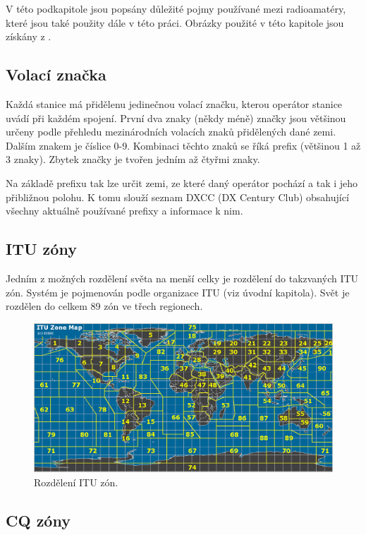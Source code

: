 V této podkapitole jsou popsány důležité pojmy používané mezi radioamatéry, které jsou také použity dále v této práci.
Obrázky použité v této kapitole jsou získány z \cite{mapability}.

\subsection{Volací značka}

Každá stanice má přidělenu jedinečnou volací značku, kterou operátor stanice uvádí při každém spojení.
První dva znaky (někdy méně) značky jsou většinou určeny podle přehledu mezinárodních volacích znaků
přidělených dané zemi.
Dalším znakem je číslice 0-9. Kombinaci těchto znaků se říká prefix (většinou 1 až
3 znaky). Zbytek značky je tvořen jedním až čtyřmi znaky.

Na základě prefixu tak lze určit zemi, ze které daný operátor pochází a tak i
jeho přibližnou polohu. K tomu slouží seznam DXCC (DX Century Club)%
obsahující všechny aktuálně používané prefixy a informace k nim.

\subsection{ITU zóny}

Jedním z možných rozdělení světa na menší celky je rozdělení do takzvaných ITU zón.
Systém je pojmenován podle organizace ITU (viz úvodní kapitola). Svět je rozdělen do celkem 
89 zón ve třech regionech.

\begin{figure}[h]
\centering
\includegraphics[trim=0cm 0cm 0cm 0cm, scale=0.4]{fig/itu-zone}
\caption{Rozdělení ITU zón.}
\label{fig:FigureExample}
\end{figure}

\subsection{CQ zóny}


